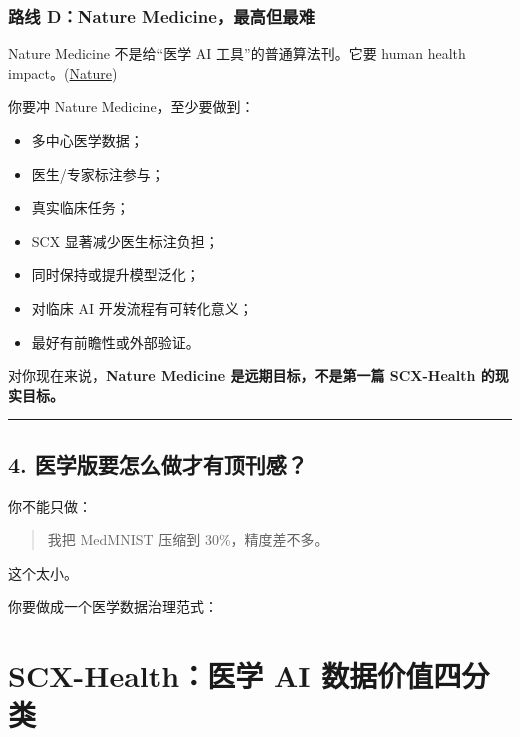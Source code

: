 \documentclass[
  12pt,
]{ctexart}
\providecommand{\tightlist}{%
  \setlength{\itemsep}{0pt}\setlength{\parskip}{0pt}}
\begin{document}
\subsubsection{路线 D：Nature
Medicine，最高但最难}\label{ux8defux7ebf-dnature-medicineux6700ux9ad8ux4f46ux6700ux96be}

Nature Medicine 不是给``医学 AI 工具''的普通算法刊。它要 human health
impact。(\href{https://arxiv.org/html/2406.17557v1?utm_source=chatgpt.com}{Nature})

你要冲 Nature Medicine，至少要做到：

\begin{itemize}
\tightlist
\item
  多中心医学数据；
\item
  医生/专家标注参与；
\item
  真实临床任务；
\item
  SCX 显著减少医生标注负担；
\item
  同时保持或提升模型泛化；
\item
  对临床 AI 开发流程有可转化意义；
\item
  最好有前瞻性或外部验证。
\end{itemize}

对你现在来说，\textbf{Nature Medicine 是远期目标，不是第一篇 SCX-Health
的现实目标。}

\begin{center}\rule{0.5\linewidth}{0.5pt}\end{center}

\subsection{4.
医学版要怎么做才有顶刊感？}\label{ux533bux5b66ux7248ux8981ux600eux4e48ux505aux624dux6709ux9876ux520aux611f}

你不能只做：

\begin{quote}
我把 MedMNIST 压缩到 30\%，精度差不多。
\end{quote}

这个太小。

你要做成一个医学数据治理范式：

\section{\texorpdfstring{\textbf{SCX-Health：医学 AI
数据价值四分类}}{SCX-Health：医学 AI 数据价值四分类}}\label{scx-healthux533bux5b66-ai-ux6570ux636eux4ef7ux503cux56dbux5206ux7c7b}
\end{document}
